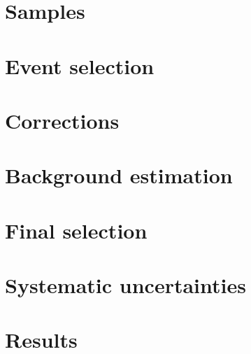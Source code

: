 %

\section{Samples} \label{sec:Samples}


\section{Event selection} \label{sec:EventSelection}


\section{Corrections} \label{sec:Corrections}


\section{Background estimation} \label{sec:Backgrounds}


\section{Final selection} \label{sec:FinalSelection}


\section{Systematic uncertainties} \label{sec:Systematics}


\section{Results} \label{sec:Results}


%